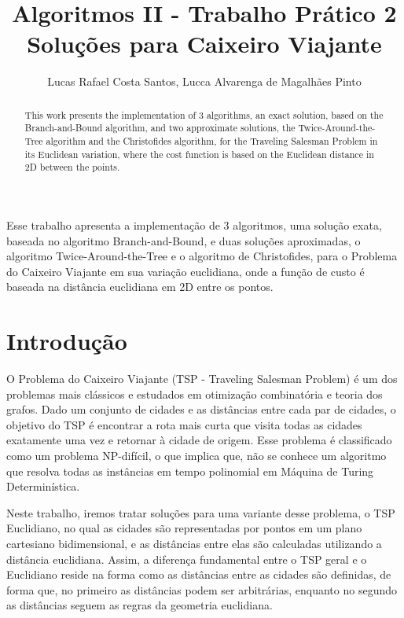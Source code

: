 \documentclass[12pt]{article}
\title{Algoritmos II - Trabalho Prático 2\\  Soluções para Caixeiro Viajante}
\author{Lucas Rafael Costa Santos\inst{1}, Lucca Alvarenga de Magalhães Pinto\inst{2}}
\begin{document}
 

\maketitle

\begin{abstract}
This work presents the implementation of 3 algorithms, an exact solution, based on the Branch-and-Bound algorithm, and two approximate solutions, the Twice-Around-the-Tree algorithm and the Christofides algorithm, for the Traveling Salesman Problem in its Euclidean variation, where the cost function is based on the Euclidean distance in 2D between the points.
\end{abstract}
     
\begin{resumo} 
Esse trabalho apresenta a implementação de 3 algoritmos, uma solução exata, baseada no algoritmo Branch-and-Bound, e duas soluções aproximadas, o algoritmo Twice-Around-the-Tree e o algoritmo de Christofides, para o Problema do Caixeiro Viajante em sua variação euclidiana, onde a função de custo é baseada na distância euclidiana em 2D entre os pontos. 
\end{resumo}

\section{Introdução } \label{sec:firstpage}

O Problema do Caixeiro Viajante (TSP - Traveling Salesman Problem) é um dos problemas mais clássicos e estudados em otimização combinatória e teoria dos grafos. Dado um conjunto de cidades e as distâncias entre cada par de cidades, o objetivo do TSP é encontrar a rota mais curta que visita todas as cidades exatamente uma vez e retornar à cidade de origem. Esse problema é classificado como um problema NP-difícil, o que implica que, não se conhece um algoritmo que resolva todas as instâncias em tempo polinomial em Máquina de Turing Determinística.

Neste trabalho, iremos tratar soluções para uma variante desse problema, o TSP Euclidiano, no qual as cidades são representadas por pontos em um plano cartesiano bidimensional, e as distâncias entre elas são calculadas utilizando a distância euclidiana. Assim, a diferença fundamental entre o TSP geral e o Euclidiano reside na forma como as distâncias entre as cidades são definidas, de forma que, no primeiro as distâncias podem ser arbitrárias, enquanto no segundo as distâncias seguem as regras da geometria euclidiana.
\end{document}
